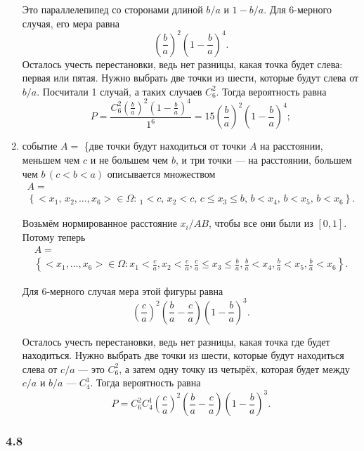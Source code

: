 \begin{enumerate}[label=\alph*)]
Это параллелепипед со сторонами длиной $b/a$ и $1 - b/a$.
Для 6-мерного случая, его мера равна
$$ \left( \frac{b}{a} \right)^2 \left( 1 - \frac{b}{a} \right)^4.$$
Осталось учесть перестановки, ведь нет разницы, какая точка будет слева: первая или пятая.
Нужно выбрать две точки из шести, которые будут слева от $b/a$.
Посчитали 1 случай, а таких случаев $C_6^2$.
Тогда вероятность равна
$$P =
\frac{C_6^2 \left( \frac{b}{a} \right)^2 \left( 1 - \frac{b}{a} \right)^4}{1^6} =
15 \left( \frac{b}{a} \right)^2 \left( 1 - \frac{b}{a} \right)^4;$$

\item событие $A =$
\{две точки будут находиться от точки $A$ на расстоянии,
меньшем чем $c$ и не большем чем $b$, и три точки ---
на расстоянии, большем чем
$b \,
\left( c<b<a \right)$
описывается множеством
\begin{equation*}
\begin{split}
A = \\
\left\{ <x_1, \, x_2, \dotsc, x_6> \in \Omega: \,
_1 < c, \,
x_2 < c, \,
c \leq x_3 \leq b, \,
b < x_4, \,
b < x_5, \,
b < x_6 \right\}.
\end{split}
\end{equation*}

Возьмём нормированное расстояние $x_i/AB$, чтобы все они были из $ \left[ 0, 1 \right] $.
Потому теперь
\begin{equation*}
\begin{split}
A = \\
\left\{ <x_1, \dotsc, x_6> \in \Omega:
x_1 < \frac{c}{a},
x_2 < \frac{c}{a},
\frac{c}{a} \leq x_3 \leq \frac{b}{a},
\frac{b}{a} < x_4,
\frac{b}{a} < x_5,
\frac{b}{a} < x_6 \right\}.
\end{split}
\end{equation*}

Для 6-мерного случая мера этой фигуры равна
$$ \left( \frac{c}{a} \right)^2 \left( \frac{b}{a} - \frac{c}{a} \right) \left( 1 - \frac{b}{a} \right)^3.$$

Осталось учесть перестановки, ведь нет разницы, какая точка где будет находиться.
Нужно выбрать две точки из шести, которые будут находиться слева от $c/a$ --- это $C_6^2$, а затем одну точку из четырёх, которая будет между $c/a$ и $b/a$ --- $C_4^1$.
Тогда вероятность равна
$$P =
C_6^2 C_4^1 \left( \frac{c}{a} \right)^2 \left( \frac{b}{a} - \frac{c}{a} \right) \left( 1 - \frac{b}{a} \right)^3.$$
\end{enumerate}

\subsubsection*{4.8}

